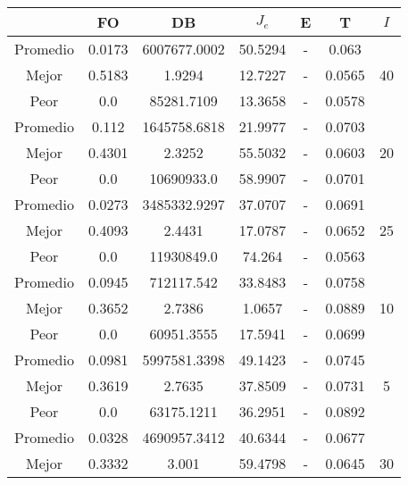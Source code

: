 \begin{table}[h!]
    \footnotesize
    \begin{center}
        \begin{tabular}{|c|c|c|c|c|c|c|}
        \hline
            & {\bf FO} & {\bf DB} & $J_e$ & {\bf E} & {\bf T} & $I$\\
        \hline
        \hline
            Promedio  & 0.0173 & 6007677.0002 & 50.5294 & - & 0.063 & \\
            \cline{1-6}
            Mejor & 0.5183 & 1.9294  & 12.7227 & - & 0.0565 & 40\\
            \cline{1-6}
            Peor & 0.0 & 85281.7109  & 13.3658 & - & 0.0578 & \\
        \hline
        \hline
            Promedio  & 0.112 & 1645758.6818 & 21.9977 & - & 0.0703 & \\
            \cline{1-6}
            Mejor & 0.4301 & 2.3252  & 55.5032 & - & 0.0603 & 20\\
            \cline{1-6}
            Peor & 0.0 & 10690933.0  & 58.9907 & - & 0.0701 & \\
        \hline
        \hline
            Promedio  & 0.0273 & 3485332.9297 & 37.0707 & - & 0.0691 & \\
            \cline{1-6}
            Mejor & 0.4093 & 2.4431  & 17.0787 & - & 0.0652 & 25\\
            \cline{1-6}
            Peor & 0.0 & 11930849.0  & 74.264 & - & 0.0563 & \\
        \hline
        \hline
            Promedio  & 0.0945 & 712117.542 & 33.8483 & - & 0.0758 & \\
            \cline{1-6}
            Mejor & 0.3652 & 2.7386  & 1.0657 & - & 0.0889 & 10\\
            \cline{1-6}
            Peor & 0.0 & 60951.3555  & 17.5941 & - & 0.0699 & \\
        \hline
        \hline
            Promedio  & 0.0981 & 5997581.3398 & 49.1423 & - & 0.0745 & \\
            \cline{1-6}
            Mejor & 0.3619 & 2.7635  & 37.8509 & - & 0.0731 & 5\\
            \cline{1-6}
            Peor & 0.0 & 63175.1211  & 36.2951 & - & 0.0892 & \\
        \hline
        \hline
            Promedio  & 0.0328 & 4690957.3412 & 40.6344 & - & 0.0677 & \\
            \cline{1-6}
            Mejor & 0.3332 & 3.001  & 59.4798 & - & 0.0645 & 30\\

\end{tabular}
\end{center}
\end{table}
